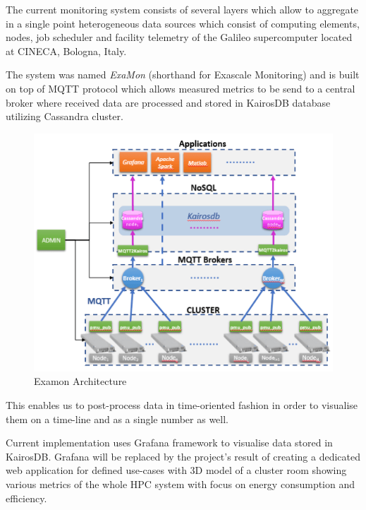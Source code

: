 \documentclass[a4paper, twoside]{article}
\newcommand{\highlight}[1]{\textcolor{prace-orange}{#1}}
\begin{document}
\begin{multicols}{3}

\lettrine[lines=4,nindent=0em]{\highlight{T}}{}he current monitoring system\cite{current} consists of several layers which allow to aggregate in a single point heterogeneous data sources which consist of computing elements, nodes, job scheduler and facility telemetry of the Galileo supercomputer located at CINECA, Bologna, Italy.

The system was named \textit{ExaMon} (shorthand for Exascale Monitoring) and is built on top of MQTT protocol\cite{mqtt} which allows measured metrics to be send to a central broker where received data are processed and stored in KairosDB database utilizing Cassandra cluster.

\begin{figure}[H]
    \includegraphics[width=0.9\linewidth]{examon-architecture}
    \caption{Examon Architecture}
    \label{arch}
\end{figure}

This enables us to post-process data in time-oriented fashion in order to visualise them on a time-line and as a single number as well.

Current implementation uses Grafana framework to visualise data stored in KairosDB. Grafana will be replaced by the project's result of creating a dedicated web application for defined use-cases with 3D model of a cluster room showing various metrics of the whole HPC system with focus on energy consumption and efficiency.


\end{multicols}
\end{document}
